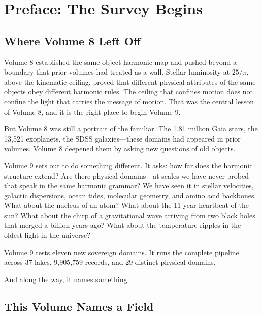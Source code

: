 \documentclass[11pt, letterpaper, openany]{book}
\begin{document}
\tableofcontents
\clearpage

\chapter*{Preface: The Survey Begins}

\section*{Where Volume 8 Left Off}

Volume 8 established the same-object harmonic map and pushed beyond a boundary that
prior volumes had treated as a wall. Stellar luminosity at $25/\pi$, above the
kinematic ceiling, proved that different physical attributes of the same objects
obey different harmonic rules. The ceiling that confines motion does not confine
the light that carries the message of motion. That was the central lesson of
Volume 8, and it is the right place to begin Volume 9.

But Volume 8 was still a portrait of the familiar. The 1.81 million Gaia stars,
the 13,521 exoplanets, the SDSS galaxies---these domains had appeared in prior
volumes. Volume 8 deepened them by asking new questions of old objects.

Volume 9 sets out to do something different. It asks: how far does the harmonic
structure extend? Are there physical domains---at scales we have never probed---that
speak in the same harmonic grammar? We have seen it in stellar velocities, galactic
dispersions, ocean tides, molecular geometry, and amino acid backbones. What about
the nucleus of an atom? What about the 11-year heartbeat of the sun? What about the
chirp of a gravitational wave arriving from two black holes that merged a billion
years ago? What about the temperature ripples in the oldest light in the universe?

Volume 9 tests eleven new sovereign domains. It runs the complete pipeline across
37 lakes, 9,905,759 records, and 29 distinct physical domains.

And along the way, it names something.

\section*{This Volume Names a Field}
\end{document}
